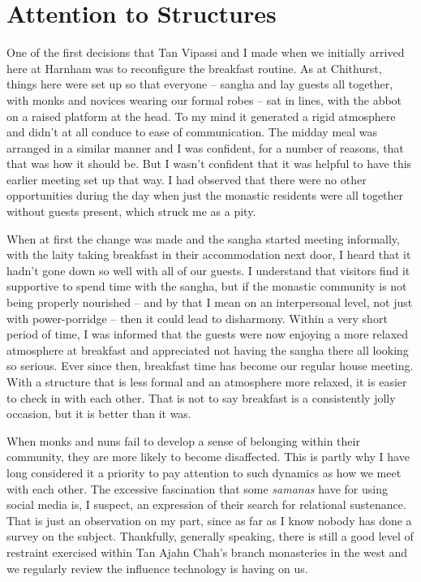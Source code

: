 \section{Attention to Structures}

One of the first decisions that Tan Vipassi and I made when we initially
arrived here at Harnham was to reconfigure the breakfast routine. As at
Chithurst, things here were set up so that everyone -- sangha and lay
guests all together, with monks and novices wearing our formal robes --
sat in lines, with the abbot on a raised platform at the head. To my
mind it generated a rigid atmosphere and didn't at all conduce to ease
of communication. The midday meal was arranged in a similar manner and I
was confident, for a number of reasons, that that was how it should be.
But I wasn't confident that it was helpful to have this earlier meeting
set up that way. I had observed that there were no other opportunities
during the day when just the monastic residents were all together
without guests present, which struck me as a pity.

When at first the change was made and the sangha started meeting
informally, with the laity taking breakfast in their accommodation next
door, I heard that it hadn't gone down so well with all of our guests. I
understand that visitors find it supportive to spend time with the
sangha, but if the monastic community is not being properly nourished --
and by that I mean on an interpersonal level,
not just with power-porridge\cite{porridge}
-- then it could lead to disharmony. Within a very short
period of time, I was informed that the guests were now enjoying a more
relaxed atmosphere at breakfast and appreciated not having the sangha
there all looking so serious. Ever since then, breakfast time has become
our regular house meeting. With a structure that is less formal and an
atmosphere more relaxed, it is easier to check in with each other. That
is not to say breakfast is a consistently jolly occasion, but it is
better than it was.

When monks and nuns fail to develop a sense of belonging within their
community, they are more likely to become disaffected. This is partly
why I have long considered it a priority to pay attention to such
dynamics as how we meet with each other. The excessive fascination that
some \emph{samanas} have for using social media is, I suspect, an
expression of their search for relational sustenance.
That is just an observation on my part, since as far as I
know nobody has done a survey on the subject. Thankfully, generally
speaking, there is still a good level of restraint exercised within Tan
Ajahn Chah's branch monasteries in the west and we regularly review the
influence technology is having on us.

